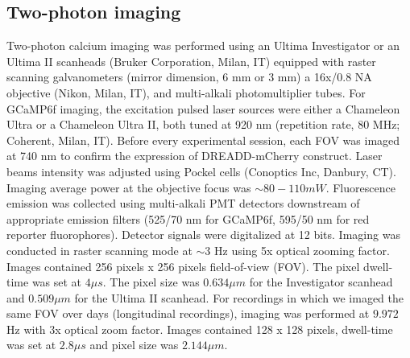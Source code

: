 \subsection{Two-photon imaging}
Two-photon calcium imaging was performed using an Ultima Investigator or an Ultima II scanheads (Bruker Corporation, Milan, IT) equipped with raster scanning galvanometers (mirror dimension, 6 mm or 3 mm) a 16x/0.8 NA objective (Nikon, Milan, IT), and multi-alkali photomultiplier tubes. 
For GCaMP6f imaging, the excitation pulsed laser sources were either a Chameleon Ultra or a Chameleon Ultra II, both tuned at 920 nm (repetition rate, 80 MHz; Coherent, Milan, IT).
Before every experimental session, each FOV was imaged at 740 nm to confirm the expression of DREADD-mCherry construct. 
Laser beams intensity was adjusted using Pockel cells (Conoptics Inc, Danbury, CT).
Imaging average power at the objective focus was $\sim 80-110 mW$. 
Fluorescence emission was collected using multi-alkali PMT detectors downstream of appropriate emission filters (525/70 nm for GCaMP6f, 595/50 nm for red reporter fluorophores). 
Detector signals were digitalized at 12 bits. 
Imaging was conducted in raster scanning mode at $\sim 3$ Hz using 5x optical zooming factor. 
Images contained 256 pixels x 256 pixels field-of-view (FOV). The pixel dwell-time was set at $4 \mu s$. The pixel size was $0.634 \mu m$ for the Investigator scanhead and $0.509 \mu m$ for the Ultima II scanhead.
For recordings in which we imaged the same FOV over days (longitudinal recordings), imaging was performed at $9.972$ Hz with 3x optical zoom factor.
Images contained 128 x 128 pixels, dwell-time was set at $2.8 \mu s$ and pixel size was $2.144 \mu m$.
